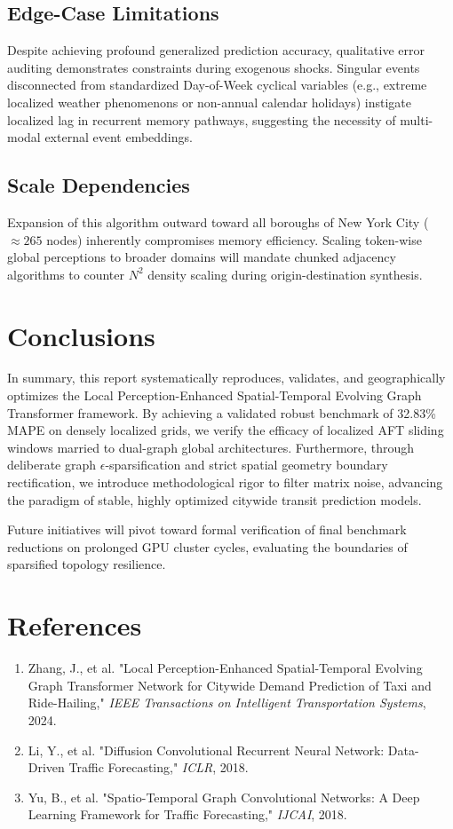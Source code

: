 \documentclass{rapportECL}
\begin{document}
\subsection{Edge-Case Limitations}
Despite achieving profound generalized prediction accuracy, qualitative error auditing demonstrates constraints during exogenous shocks. Singular events disconnected from standardized Day-of-Week cyclical variables (e.g., extreme localized weather phenomenons or non-annual calendar holidays) instigate localized lag in recurrent memory pathways, suggesting the necessity of multi-modal external event embeddings.

\subsection{Scale Dependencies}
Expansion of this algorithm outward toward all boroughs of New York City ($\approx 265$ nodes) inherently compromises memory efficiency. Scaling token-wise global perceptions to broader domains will mandate chunked adjacency algorithms to counter $N^2$ density scaling during origin-destination synthesis.

\section{Conclusions}
In summary, this report systematically reproduces, validates, and geographically optimizes the Local Perception-Enhanced Spatial-Temporal Evolving Graph Transformer framework. By achieving a validated robust benchmark of 32.83\% MAPE on densely localized grids, we verify the efficacy of localized AFT sliding windows married to dual-graph global architectures. Furthermore, through deliberate graph $\epsilon$-sparsification and strict spatial geometry boundary rectification, we introduce methodological rigor to filter matrix noise, advancing the paradigm of stable, highly optimized citywide transit prediction models. 

Future initiatives will pivot toward formal verification of final benchmark reductions on prolonged GPU cluster cycles, evaluating the boundaries of sparsified topology resilience.

\section{References}
\begin{enumerate}
    \item Zhang, J., et al. "Local Perception-Enhanced Spatial-Temporal Evolving Graph Transformer Network for Citywide Demand Prediction of Taxi and Ride-Hailing," \textit{IEEE Transactions on Intelligent Transportation Systems}, 2024.
    \item Li, Y., et al. "Diffusion Convolutional Recurrent Neural Network: Data-Driven Traffic Forecasting," \textit{ICLR}, 2018.
    \item Yu, B., et al. "Spatio-Temporal Graph Convolutional Networks: A Deep Learning Framework for Traffic Forecasting," \textit{IJCAI}, 2018.
\end{enumerate}
\end{document}
